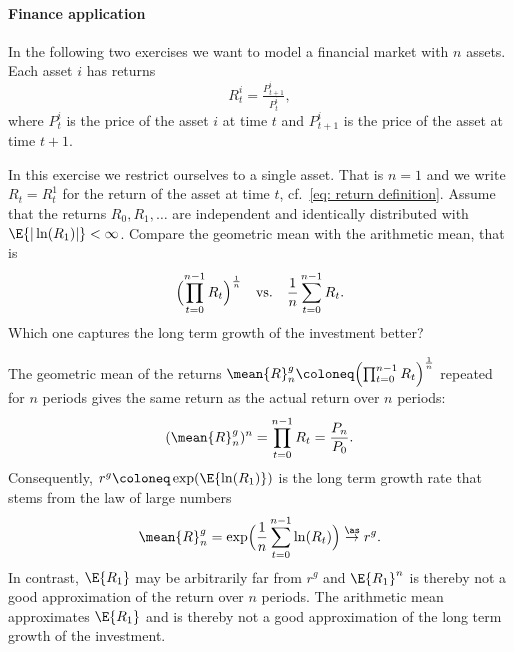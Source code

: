 \paragraph*{Finance application}

In the following two exercises we want to model a financial market with \(n\)
assets. Each asset \(i\) has returns
\begin{equation}
    \label{eq: return definition}    
    R_t^i = \tfrac{P_{t+1}^i}{P_t^i},
\end{equation}
where \(P_t^i\) is the price of the asset \(i\) at time \(t\) and
\(P_{t+1}^i\) is the price of the asset at time \(t+1\).

\begin{exercise}
    In this exercise we restrict ourselves to a single asset.
    That is \(n=1\) and we write \(R_t = R_t^1\) for the return of the asset at
    time \(t\), cf.~\eqref{eq: return definition}.
    Assume that the returns \(R_0, R_1, \dots\) are independent and identically
    distributed with \(\E{|\ln(R_1)|} < \infty\). Compare the
    geometric mean with the arithmetic mean, that is
    \[
        \Bigl(\prod_{t=0}^{n-1} R_t\Bigr)^\frac1n
        \quad \text{vs.} \quad
        \frac1n\sum_{t=0}^{n-1} R_t.
    \]
    Which one captures the long term growth of the investment better?
    \begin{solution}
        The geometric mean of the returns \(\mean{R}^g_n \coloneq \Bigl(\prod_{t=0}^{n-1} R_t\Bigr)^\frac1n\)
        repeated for \(n\) periods gives the same return as the actual return over \(n\) periods:
        \[
            (\mean{R}^g_n)^n = \prod_{t=0}^{n-1} R_t = \frac{P_n}{P_0}.
        \]
        Consequently, \(r^g \coloneq \exp(\E{\ln(R_1)})\) is the long term
        growth rate that stems from the law of large numbers
        \[
            \mean{R}^g_n  = \exp\Bigl(\frac1n \sum_{t=0}^{n-1} \ln(R_t)\Bigr) \overset{\as}\to r^g.
        \]
        In contrast, \(\E{R_1}\) may be arbitrarily far from \(r^g\) and
        \(\E{R_1}^n\) is thereby not a good approximation of the return over \(n\) periods.
        The arithmetic mean approximates \(\E{R_1}\) and is thereby not a good
        approximation of the long term growth of the investment.
    \end{solution}
\end{exercise}

